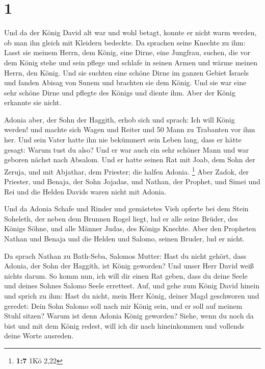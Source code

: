 \hypertarget{section}{%
\section{1}\label{section}}

 Und da der König David alt war und wohl betagt, konnte er
nicht warm werden, ob man ihn gleich mit Kleidern bedeckte.
 Da sprachen seine Knechte zu ihm: Lasst sie meinem Herrn,
dem König, eine Dirne, eine Jungfrau, suchen, die vor dem König stehe
und sein pflege und schlafe in seinen Armen und wärme meinen Herrn, den
König.  Und sie suchten eine schöne Dirne im ganzen Gebiet
Israels und fanden Abisag von Sunem und brachten sie dem König.
 Und sie war eine sehr schöne Dirne und pflegte des Königs
und diente ihm. Aber der König erkannte sie nicht.

 Adonia aber, der Sohn der Haggith, erhob sich und sprach:
Ich will König werden! und machte sich Wagen und Reiter und 50 Mann zu
Trabanten vor ihm her.  Und sein Vater hatte ihn nie
bekümmert sein Leben lang, dass er hätte gesagt: Warum tust du also? Und
er war auch ein sehr schöner Mann und war geboren nächst nach Absalom.
 Und er hatte seinen Rat mit Joab, dem Sohn der Zeruja,
und mit Abjathar, dem Priester; die halfen Adonia. \footnote{\textbf{1:7}
  1Kö 2,22}  Aber Zadok, der Priester, und Benaja, der
Sohn Jojadas, und Nathan, der Prophet, und Simei und Rei und die Helden
Davids waren nicht mit Adonia.

 Und da Adonia Schafe und Rinder und gemästetes Vieh
opferte bei dem Stein Soheleth, der neben dem Brunnen Rogel liegt, lud
er alle seine Brüder, des Königs Söhne, und alle Männer Judas, des
Königs Knechte.  Aber den Propheten Nathan und Benaja und
die Helden und Salomo, seinen Bruder, lud er nicht.

 Da sprach Nathan zu Bath-Seba, Salomos Mutter: Hast du
nicht gehört, dass Adonia, der Sohn der Haggith, ist König geworden? Und
unser Herr David weiß nichts darum.  So komm nun, ich
will dir einen Rat geben, dass du deine Seele und deines Sohnes Salomo
Seele errettest.  Auf, und gehe zum König David hinein
und sprich zu ihm: Hast du nicht, mein Herr König, deiner Magd
geschworen und geredet: Dein Sohn Salomo soll nach mir König sein, und
er soll auf meinem Stuhl sitzen? Warum ist denn Adonia König geworden?
 Siehe, wenn du noch da bist und mit dem König redest,
will ich dir nach hineinkommen und vollends deine Worte ausreden.

